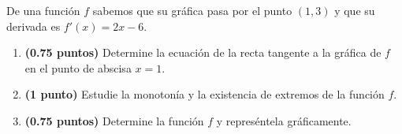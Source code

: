 
De una función $f$ sabemos que su gráfica pasa por el punto $(1,3)$ y que su derivada es $f'(x)=2x-6$.
\begin{enumerate}[label=\alph*)]
\item \textbf{(0.75 puntos)} Determine la ecuación de la recta tangente a la gráfica de $f$ en el punto de abscisa $x=1$.
\item \textbf{(1 punto)} Estudie la monotonía y la existencia de extremos de la función $f$.
\item \textbf{(0.75 puntos)} Determine la función $f$ y represéntela gráficamente.
\end{enumerate}
